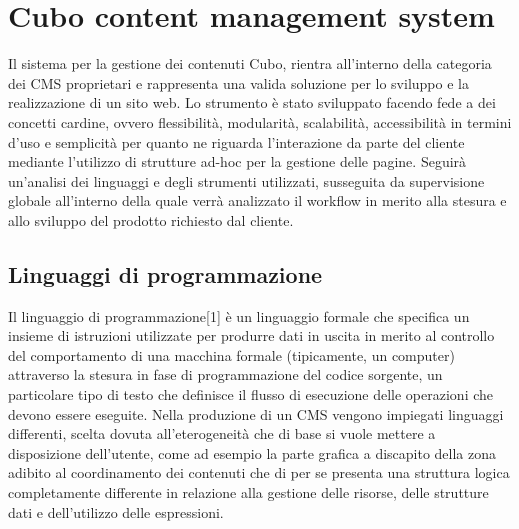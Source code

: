 \chapter{Cubo content management system}
\label{chap:CuboCMS}

Il sistema per la gestione dei contenuti Cubo, rientra all'interno della categoria dei CMS proprietari e rappresenta una valida soluzione per lo sviluppo e la realizzazione di un sito web.\hfill \break
Lo strumento è stato sviluppato facendo fede a dei concetti cardine, ovvero flessibilità, modularità, scalabilità, accessibilità in termini d'uso e semplicità per quanto ne riguarda l'interazione da parte del cliente mediante l'utilizzo di strutture ad-hoc per la gestione delle pagine.\hfill \break
Seguirà un'analisi dei linguaggi e degli strumenti utilizzati, susseguita da supervisione globale all'interno della quale verrà analizzato il workflow in merito alla stesura e allo sviluppo del prodotto richiesto dal cliente.
\clearpage
\section{Linguaggi di programmazione}
Il linguaggio di programmazione[1] è un linguaggio formale che specifica un insieme di istruzioni utilizzate per produrre dati in uscita in merito al controllo del comportamento di una macchina formale (tipicamente, un computer) attraverso la stesura in fase di programmazione del codice sorgente, un particolare tipo di testo che definisce il flusso di esecuzione delle operazioni che devono essere eseguite.\hfill \break
Nella produzione di un CMS vengono impiegati linguaggi differenti, scelta dovuta all'eterogeneità che di base si vuole mettere a disposizione dell'utente, come ad esempio la parte grafica a discapito della zona adibito al coordinamento dei contenuti che di per se presenta una struttura logica completamente differente in relazione alla gestione delle risorse, delle strutture dati e dell'utilizzo delle espressioni.

